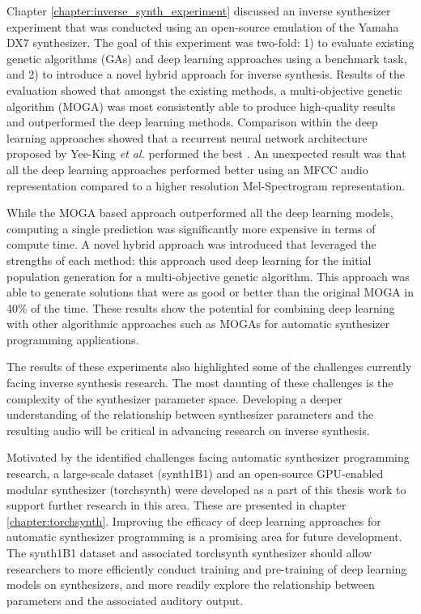 Chapter \ref{chapter:inverse_synth_experiment} discussed an inverse synthesizer experiment that was conducted using an open-source emulation of the Yamaha DX7 synthesizer. The goal of this experiment was two-fold: 1) to evaluate existing genetic algorithms (GAs) and deep learning approaches using a benchmark task, and 2) to introduce a novel hybrid approach for inverse synthesis. Results of the evaluation showed that amongst the existing methods, a multi-objective genetic algorithm (MOGA) \cite{tatar2016automatic} was most consistently able to produce high-quality results and outperformed the deep learning methods. Comparison within the deep learning approaches showed that a recurrent neural network architecture proposed by Yee-King \textit{et al.} performed the best \cite{yee2018automatic}. An unexpected result was that all the deep learning approaches performed better using an MFCC audio representation compared to a higher resolution Mel-Spectrogram representation. 

While the MOGA based approach outperformed all the deep learning models, computing a single prediction was significantly more expensive in terms of compute time. A novel hybrid approach was introduced that leveraged the strengths of each method: this approach used deep learning for the initial population generation for a multi-objective genetic algorithm. This approach was able to generate solutions that were as good or better than the original MOGA in 40\% of the time. These results show the potential for combining deep learning with other algorithmic approaches such as MOGAs for automatic synthesizer programming applications.

The results of these experiments also highlighted some of the challenges currently facing inverse synthesis research. The most daunting of these challenges is the complexity of the synthesizer parameter space. %
Developing a deeper understanding of the relationship between synthesizer parameters and the resulting audio will be critical in advancing research on inverse synthesis.

Motivated by the identified challenges facing automatic synthesizer programming research, a large-scale dataset (synth1B1) and an open-source GPU-enabled modular synthesizer (torchsynth) were developed as a part of this thesis work to support further research in this area. These are presented in chapter \ref{chapter:torchsynth}. Improving the efficacy of deep learning approaches for automatic synthesizer programming is a promising area for future development. The synth1B1 dataset and associated torchsynth synthesizer should allow researchers to more efficiently conduct training and pre-training of deep learning models on synthesizers, and more readily explore the relationship between parameters and the associated auditory output. 

